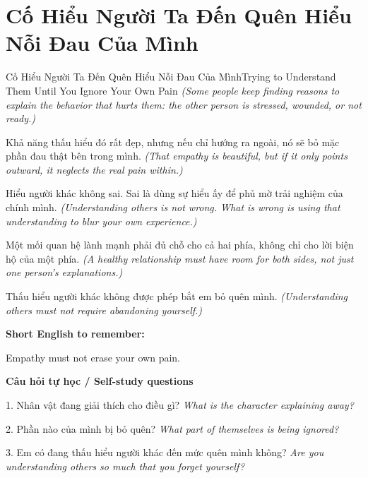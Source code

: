 \section{Cố Hiểu Người Ta Đến Quên Hiểu Nỗi Đau Của Mình}
\begin{truyen}{Cố Hiểu Người Ta Đến Quên Hiểu Nỗi Đau Của Mình}{Trying to Understand Them Until You Ignore Your Own Pain}
\textit{(Some people keep finding reasons to explain the behavior that hurts them: the other person is stressed, wounded, or not ready.)}

Khả năng thấu hiểu đó rất đẹp, nhưng nếu chỉ hướng ra ngoài, nó sẽ bỏ mặc phần đau thật bên trong mình.
\textit{(That empathy is beautiful, but if it only points outward, it neglects the real pain within.)}

Hiểu người khác không sai. Sai là dùng sự hiểu ấy để phủ mờ trải nghiệm của chính mình.
\textit{(Understanding others is not wrong. What is wrong is using that understanding to blur your own experience.)}

Một mối quan hệ lành mạnh phải đủ chỗ cho cả hai phía, không chỉ cho lời biện hộ của một phía.
\textit{(A healthy relationship must have room for both sides, not just one person's explanations.)}

\end{truyen}

\begin{baihoc}
Thấu hiểu người khác không được phép bắt em bỏ quên mình.
\textit{(Understanding others must not require abandoning yourself.)}
\end{baihoc}

\begin{ghinhoanh}
\textbf{Short English to remember:}

Empathy must not erase your own pain.

\end{ghinhoanh}

\begin{tuhocnhanh}
\textbf{Câu hỏi tự học / Self-study questions}

1. Nhân vật đang giải thích cho điều gì? \textit{What is the character explaining away?}

2. Phần nào của mình bị bỏ quên? \textit{What part of themselves is being ignored?}

3. Em có đang thấu hiểu người khác đến mức quên mình không? \textit{Are you understanding others so much that you forget yourself?}
\end{tuhocnhanh}
\ngancach

